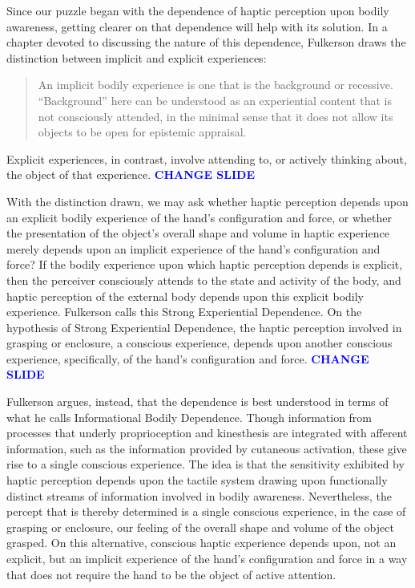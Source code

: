 \documentclass[12pt]{article}
\newcommand{\change}{\textcolor{blue}{\textbf{CHANGE SLIDE}}}
\begin{document}
Since our puzzle began with the dependence of haptic perception upon bodily awareness, getting clearer on that dependence will help with its solution. In a chapter devoted to discussing the nature of this dependence, Fulkerson draws the distinction between implicit and explicit experiences:
\begin{quote}
	An implicit bodily experience is one that is the background or recessive. ``Background'' here can be understood as an experiential content that is not consciously attended, in the minimal sense that it does not allow its objects to be open for epistemic appraisal. 
\end{quote}
Explicit experiences, in contrast, involve attending to, or actively thinking about, the object of that experience. \change

With the distinction drawn, we may ask whether haptic perception depends upon an explicit bodily experience of the hand's configuration and force, or whether the presentation of the object's overall shape and volume in haptic experience merely depends upon an implicit experience of the hand's configuration and force? If the bodily experience upon which haptic perception depends is explicit, then the perceiver consciously attends to the state and activity of the body, and haptic perception of the external body depends upon this explicit bodily experience. Fulkerson calls this Strong Experiential Dependence. On the hypothesis of Strong Experiential Dependence, the haptic perception involved in grasping or enclosure, a conscious experience, depends upon another conscious experience, specifically, of the hand's configuration and force. \change

Fulkerson argues, instead, that the dependence is best understood in terms of what he calls Informational Bodily Dependence. Though information from processes that underly proprioception and kinesthesis are integrated with afferent information, such as the information provided by cutaneous activation, these give rise to a single conscious experience. The idea is that the sensitivity exhibited by haptic perception depends upon the tactile system drawing upon functionally distinct streams of information involved in bodily awareness. Nevertheless, the percept that is thereby determined is a single conscious experience, in the case of grasping or enclosure, our feeling of the overall shape and volume of the object grasped. On this alternative, conscious haptic experience depends upon, not an explicit, but an implicit experience of the hand's configuration and force in a way that does not require the hand to be the object of active attention.
\end{document}
